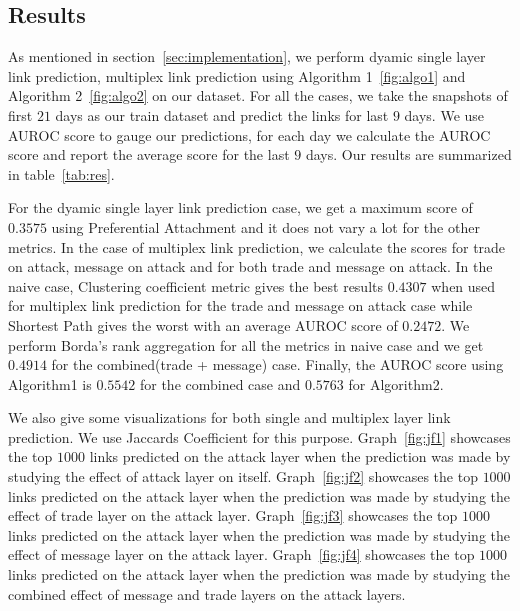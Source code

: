 



\subsection{Results}

As mentioned in section~\ref{sec:implementation}, we perform dyamic single
layer link prediction,  multiplex link prediction using Algorithm
1~\ref{fig:algo1} and Algorithm 2~\ref{fig:algo2} on our dataset. For all the
cases, we take the snapshots of first $21$ days as  our train dataset and
predict the links for last $9$ days. We use AUROC score to gauge our
predictions, for each day we calculate the AUROC score and report the average
score for the last $9$ days. Our results are summarized in table~\ref{tab:res}. 

For the dyamic single layer link prediction case, we get a maximum score of
$0.3575$ using  Preferential Attachment and it does not vary a lot for the other
metrics. In the case of multiplex link prediction, we calculate the scores for
trade on attack, message on attack and for both trade and message on attack.
In the naive case, Clustering coefficient  metric gives the best results
$0.4307$ when used for multiplex link prediction for the trade and message on
attack case while Shortest Path gives the worst with an average AUROC score of
$0.2472$. We perform Borda's rank aggregation for all the metrics in naive
case and we get $0.4914$ for the combined(trade + message) case. Finally, the
AUROC score using Algorithm1 is $0.5542$ for the combined case and  $0.5763$
for Algorithm2. 
 
We also give some visualizations for both single and multiplex layer link
prediction. We use Jaccards Coefficient for this purpose. Graph~\ref{fig:jf1}
showcases the top $1000$ links predicted on the attack layer when the
prediction was made by studying the effect of attack layer on itself.
Graph~\ref{fig:jf2} showcases the top $1000$ links predicted on the attack
layer when the prediction was made by studying the effect of trade layer on
the attack layer.  Graph~\ref{fig:jf3} showcases the top $1000$ links
predicted on the attack layer when the prediction was made by studying the
effect of message layer on the attack layer.  Graph~\ref{fig:jf4} showcases
the top $1000$ links predicted on the attack layer when the prediction was
made by studying the combined effect of message and trade layers on the attack
layers.

